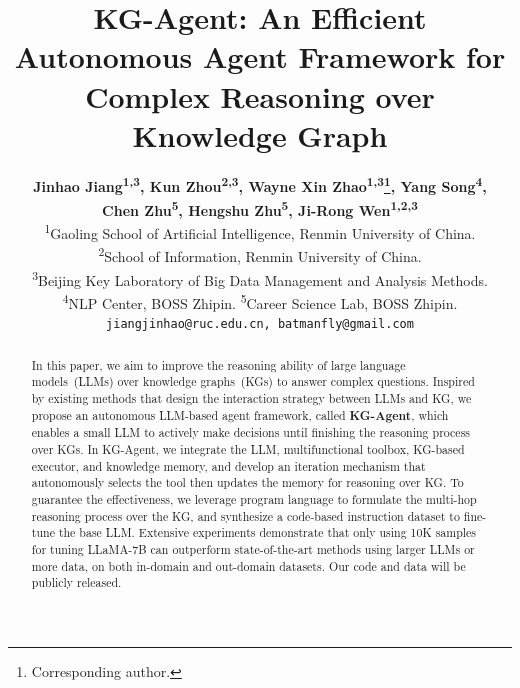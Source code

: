 \documentclass[11pt]{article}
\title{KG-Agent: An Efficient Autonomous Agent Framework for Complex Reasoning over Knowledge Graph}
\author{
    \textbf{Jinhao Jiang\textsuperscript{{1},{3}},
            Kun Zhou\textsuperscript{{2},{3}},
            Wayne Xin Zhao\textsuperscript{{1},{3}}\thanks{\llap{}\:\:\:Corresponding author.}, 
            Yang Song\textsuperscript{{4}}\footnotemark[1],
            }\\ 
    \textbf{Chen Zhu\textsuperscript{{5}}, Hengshu Zhu\textsuperscript{{5}}, Ji-Rong Wen\textsuperscript{{1},{2},{3}}}\\
	\textsuperscript{1}Gaoling School of Artificial Intelligence, Renmin University of China.\\
	\textsuperscript{2}School of Information, Renmin University of China.\\
	\textsuperscript{3}Beijing Key Laboratory of Big Data Management and Analysis Methods.\\
	\textsuperscript{4}NLP Center, BOSS Zhipin.
        \textsuperscript{5}Career Science Lab, BOSS Zhipin.\\
    	\texttt{jiangjinhao@ruc.edu.cn, batmanfly@gmail.com}\\
}
\newcommand{\ignore}[1]{}
\begin{document}
\maketitle

\begin{abstract}
In this paper, we aim to improve the reasoning ability of large language models~(LLMs) over knowledge graphs~(KGs) to answer complex questions.
Inspired by existing methods that design the interaction strategy between LLMs and KG, we propose an autonomous LLM-based agent framework, called \textbf{KG-Agent}, which enables a small LLM to actively make decisions until finishing the reasoning process over KGs.
In KG-Agent, we integrate the LLM, multifunctional toolbox, KG-based executor, and knowledge memory, and develop an iteration mechanism that autonomously selects the tool then updates the memory for reasoning over KG.
To guarantee the effectiveness, we leverage program language to formulate the multi-hop reasoning process over the KG, and synthesize a code-based instruction dataset to fine-tune the base LLM.
Extensive experiments demonstrate that only using 10K samples for tuning LLaMA-7B can outperform state-of-the-art methods using larger LLMs or more data, on both in-domain and out-domain datasets. 
Our code and data will be publicly released.
\end{abstract}


















\newpage


\clearpage

\end{document}

